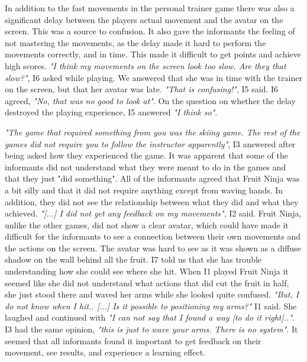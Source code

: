 In addition to the fast movements in the personal trainer game there was also a significant delay between the players actual movement and the avatar on the screen. This was a source to confusion. It also gave the informants the feeling of not mastering the movements, as the delay made it hard to perform the movements correctly, and in time. This made it difficult to get points and achieve high scores. \emph{"I think my movements on the screen look too slow. Are they that slow?"}, I6 asked while playing. We answered that she was in time with the trainer on the screen, but that her avatar was late. \emph{"That is confusing!"}, I5 said. I6 agreed, \emph{"No, that was no good to look at"}. On the question on whether the delay destroyed the playing experience, I5 answered \emph{"I think so"}.

\emph{"The game that required something from you was the skiing game. The rest of the games did not require you to follow the instructor apparently"}, I3 answered after being asked how they experienced the game. It was apparent that some of the informants did not understand what they were meant to do in the games and that they just "did something". All of the informants agreed that Fruit Ninja was a bit silly and that it did not require anything except from waving hands. In addition, they did not see the relationship between what they did and what they achieved. \emph{"[...] I did not get any feedback on my movements"}, I2 said. Fruit Ninja, unlike the other games, did not show a clear avatar, which could have made it difficult for the informants to see a connection between their own movements and the actions on the screen. The avatar was hard to see as it was shown as a diffuse shadow on the wall behind all the fruit. I7 told us that she has trouble understanding how she could see where she hit. When I1 played Fruit Ninja it seemed like she did not understand what actions that did cut the fruit in half, she just stood there and waved her arms while she looked quite confused. \emph{"But, I do not know when I hit.. [...] Is it possible to positioning my arms?"} I1 said. She laughed and continued with \emph{"I can not say that I found a way [to do it right].."}. I3 had the same opinion, \emph{"this is just to wave your arms. There is no system"}. It seemed that all informants found it important to get feedback on their movement, see results, and experience a learning effect. 

